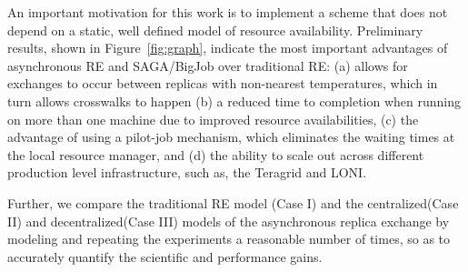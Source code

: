 \documentclass[a4paper,10pt]{article}
\newcommand{\jhanote}[1]{ {\textcolor{red} { ***shantenu: #1 }}}
\newcommand{\athotanote}[1]{ {\textcolor{green} { ***athota: #1 }}}
\newcommand{\jhanote}[1]{}
\newcommand{\athotanote}[1]{}
\begin{document}
An important motivation for this work is to implement a scheme that does not depend on a
static, well defined model of resource availability. %
Preliminary results, shown in Figure~\ref{fig:graph}, indicate the most important advantages of asynchronous RE and SAGA/BigJob over traditional RE: (a) allows for exchanges to occur between replicas with non-nearest temperatures, which in turn allows crosswalks to happen (b) a reduced time to completion when running on more than one machine due to improved resource availabilities, (c) the advantage of using a pilot-job mechanism, which eliminates the waiting times at the local resource manager, and (d) the ability to scale out across different production level infrastructure, such as, the Teragrid and LONI.

Further, we compare the traditional RE model (Case I) and the centralized(Case II) and decentralized(Case III) models of the asynchronous replica exchange by modeling and repeating the experiments a reasonable number of times, so as to accurately quantify the scientific and performance gains. %


 
  
 
\end{document}

